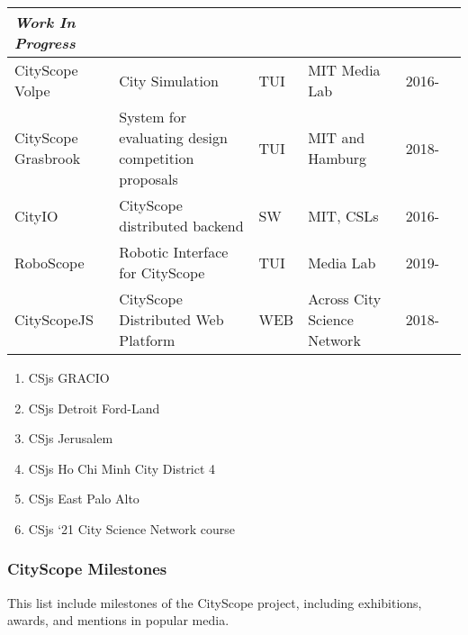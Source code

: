 \begin{sidewaystable}
\begin{adjustbox}{width=\textwidth}
\begin{tabular}{llllll}
\hline
\textit{Work In Progress}\\
\hline
CityScope Volpe & City Simulation & TUI & MIT Media Lab & 2016-\\
CityScope Grasbrook & System for evaluating design competition proposals & TUI &  MIT and Hamburg & 2018-\\

CityIO & CityScope distributed backend & SW  &  MIT,  CSLs & 2016-\\

RoboScope & Robotic Interface for CityScope & TUI & Media Lab & 2019-\\

CityScopeJS & CityScope Distributed Web Platform
 & WEB & Across City Science Network & 2018-\\

\end{tabular}
\end{adjustbox}

\begin{minipage}{0.6\textwidth}
    \fontsize{8}{6}\selectfont
    \begin{enumerate}[topsep=1pt,itemsep=-1.5ex,partopsep=0.5ex,parsep=1ex]
        \item CSjs GRACIO
        \item CSjs Detroit Ford-Land
        \item CSjs Jerusalem
        \item CSjs Ho Chi Minh City District 4
        \item CSjs East Palo Alto
        \item CSjs `21 City Science Network course 
    \end{enumerate}
\end{minipage}


\end{sidewaystable}


\newpage


\subsubsection{CityScope Milestones}
{This list include milestones of the CityScope project, including exhibitions, awards, and mentions in popular media.}


